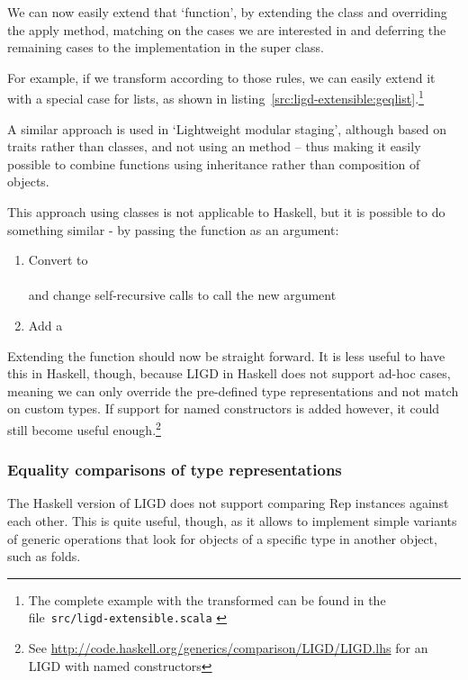 We can now easily extend that `function', by extending the class and overriding
the apply method, matching on the cases we are interested in and deferring the
remaining cases to the implementation in the super class.

For example, if we transform  according to those rules, we can
easily extend it with a special case for lists, as shown in listing~\ref{src:ligd-extensible:geqlist}.\footnote{The complete example with the transformed  can be found in
the file~\texttt{src/ligd-extensible.scala} \cite{src}}


A similar approach is used in `Lightweight modular staging'\cite{DBLP:conf/gpce/RompfO10}\cite{DBLP:journals/cacm/RompfO12},
although based on traits rather than classes, and not using an 
method -- thus making it easily possible to combine functions using inheritance
rather than composition of objects.

This approach using classes is not applicable to Haskell, but it is possible
to do something similar - by passing the function as an argument:
\begin{enumerate}
  \item Convert  to \\
        \hphantom{Convert } \\
        and change self-recursive calls to call the new argument
  \item Add a  
\end{enumerate}

Extending the function should now be straight forward. It is less useful to
have this in Haskell, though, because LIGD in Haskell does not support ad-hoc
cases, meaning we can only override the pre-defined type representations and not
match on custom types. If support for named constructors is added however, it
could still become useful enough.\footnote{See \url{http://code.haskell.org/generics/comparison/LIGD/LIGD.lhs} for an LIGD with named constructors}

\subsubsection{Equality comparisons of type representations}
The Haskell version of LIGD does not support comparing Rep instances
against each other. This is quite useful, though, as it allows to
implement simple variants of generic operations that look for objects
of a specific type in another object, such as folds.

